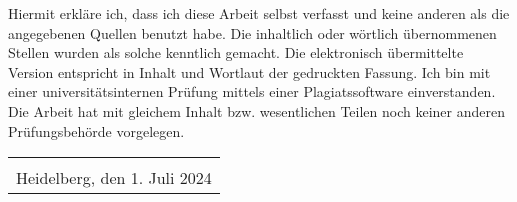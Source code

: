 \begin{myparagraph}
Hiermit erkläre ich, dass ich diese Arbeit selbst verfasst und keine anderen als die angegebenen Quellen benutzt habe. Die inhaltlich oder wörtlich übernommenen Stellen wurden als solche kenntlich gemacht. Die elektronisch übermittelte Version entspricht in Inhalt und Wortlaut der gedruckten Fassung. Ich bin mit einer universitätsinternen Prüfung mittels einer Plagiatssoftware einverstanden. Die Arbeit hat mit gleichem Inhalt bzw. wesentlichen Teilen noch keiner anderen Prüfungsbehörde vorgelegen.

\vfill

\begin{tabular}{p{2in}}
\hrulefill{} \\
Heidelberg, den 1. Juli 2024 \\
\end{tabular}

\end{myparagraph}